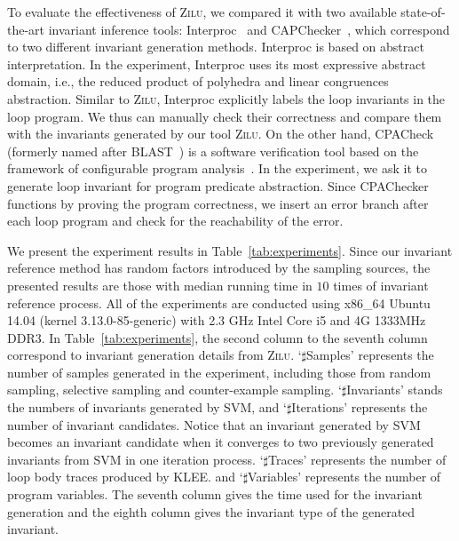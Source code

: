 To evaluate the effectiveness of \textsc{Zilu}, 
we compared it with two available state-of-the-art invariant inference tools: 
Interproc~\cite{cite} and CAPChecker~\cite{cite}, 
which correspond to two different invariant generation methods. 
Interproc is based on abstract interpretation. 
In the experiment, Interproc uses its most expressive abstract domain, i.e., 
the reduced product of polyhedra and linear congruences abstraction. 
Similar to \textsc{Zilu}, Interproc explicitly labels the loop invariants in the loop program. 
We thus can manually check their correctness
and compare them with the invariants generated by our tool \textsc{Zilu}. 
On the other hand, CPACheck (formerly named after BLAST~\cite{cite}) is a software verification tool 
based on the framework of configurable program analysis~\cite{cite}. 
In the experiment, we ask it to generate loop invariant for program predicate abstraction. 
Since CPAChecker functions by proving the program correctness, 
we insert an error branch after each loop program and check for the reachability of the error. 

We present the experiment results in Table~\ref{tab:experiments}. 
Since our invariant reference method has random factors introduced by the sampling sources, 
the presented results are those with median running time in $10$ times of invariant reference process. 
All of the experiments are conducted using x86\_64 Ubuntu 14.04 (kernel 3.13.0-85-generic) 
with 2.3 GHz Intel Core i5 and 4G 1333MHz DDR3. 
In Table~\ref{tab:experiments}, the second column to the seventh column correspond to 
invariant generation details from \textsc{Zilu}. 
`$\sharp$Samples' represents the number of samples generated in the experiment, 
including those from random sampling, selective sampling and counter-example sampling. 
`$\sharp$Invariants' stands the numbers of invariants generated by SVM, 
and `$\sharp$Iterations' represents the number of invariant candidates. 
Notice that an invariant generated by SVM becomes an invariant candidate 
when it converges to two previously generated invariants from SVM in one iteration process. 
`$\sharp$Traces' represents the number of loop body traces produced by KLEE. 
and `$\sharp$Variables' represents the number of program variables. 
The seventh column gives the time used for the invariant generation 
and the eighth column gives the invariant type of the generated invariant. 

